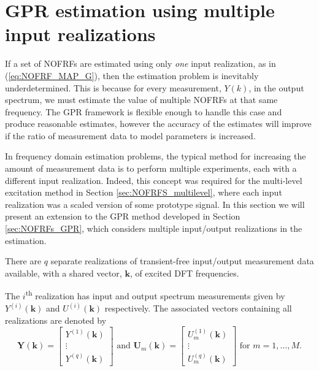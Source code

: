 
\section{GPR estimation using multiple input realizations}
\label{sec:NOFRF_MultipleRealizations}

If a set of NOFRFs are estimated using only \emph{one} input realization, as in (\ref{eq:NOFRF_MAP_G}), then the estimation problem is inevitably underdetermined. This is because for every measurement, $Y(k)$, in the output spectrum, we must estimate the value of multiple NOFRFs at that same frequency. The GPR framework is flexible enough to handle this case and produce reasonable estimates, however the accuracy of the estimates will improve if the ratio of measurement data to model parameters is increased.

In frequency domain estimation problems, the typical method for increasing the amount of measurement data is to perform multiple experiments, each with a different input realization. Indeed, this concept was required for the multi-level excitation method in Section \ref{sec:NOFRFS_multilevel}, where each input realization was a scaled version of some prototype signal. In this section we will present an extension to the GPR method developed in Section \ref{sec:NOFRFs_GPR}, which considers multiple input/output realizations in the estimation.

\begin{assum}
There are $q$ separate realizations of transient-free input/output measurement data available, with a shared vector, $\mathbf{k}$, of excited DFT frequencies.
\label{ass:NOFRFs_multiplerealz}
\end{assum}

\begin{notation}
The $i$\textsuperscript{th} realization has input and output spectrum measurements given by $Y^{(i)}(\mathbf{k})$ and $U^{(i)}(\mathbf{k})$ respectively. The associated vectors containing all realizations are denoted by
\begin{equation}
\mathbf{Y}(\mathbf{k}) = \begin{bmatrix} Y^{(1)}(\mathbf{k}) \\ \vdots \\ Y^{(q)}(\mathbf{k})\end{bmatrix} \textrm{ and } \mathbf{U}_m(\mathbf{k}) = \begin{bmatrix} U_m^{(1)}(\mathbf{k}) \\ \vdots \\ U_m^{(q)}(\mathbf{k}) \end{bmatrix} \textrm{ for } m = 1,\hdots,M.
\end{equation}
\label{not:NOFRFs_multiplerealz}
\end{notation}

